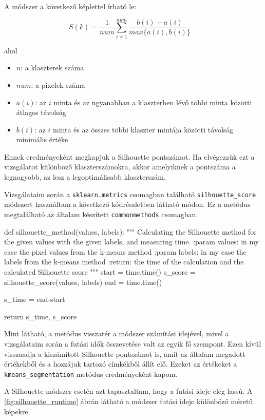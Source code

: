 A módszer a következő képlettel írható le:

\[ S(k)=\frac{1}{num} \sum_{i=1}^{num} \frac{b(i)-a(i)}{max\{a(i),b(i)\}} \quad \]

\noindent ahol
\begin{itemize}
\item $n$: a klaszterek száma
\item $num$: a pixelek száma
\item $a(i)$: az $i$ minta és az ugyanabban a klaszterben lévő többi minta közötti átlagos távolság
\item $b(i)$: az $i$ minta és az összes többi klaszter mintája közötti távolság minimális értéke
\end{itemize}
Ennek eredményeként megkapjuk a Silhouette pontszámot. Ha elvégezzük ezt a vizsgálatot különböző klaszterszámokra, akkor amelyiknek a pontszáma a legnagyobb, az lesz a legoptimálisabb klaszterszám. \cite{tomatoleaf}

Vizsgálataim során a \texttt{sklearn.metrics} csomagban található \texttt{silhouette\_score} módszert használtam a következő kódrészletben látható módon. Ez a metódus megtalálható az általam készített \texttt{commonmethods} csomagban.
\begin{python}
def silhouette_method(values, labels):
    """
    Calculating the Silhouette method for the given values with
    the given labels, and measuring time.
    :param values: in my case the pixel values from the k-means method
    :param labels: in my case the labels from the k-means method
    :return: the time of the calculation and
        the calculated Silhouette score
    """
    start = time.time()
    s_score = silhouette_score(values, labels)
    end = time.time()

    s_time = end-start

    return s_time, s_score
\end{python}
Mint látható, a metódus visszatér a módszer számítási idejével, mivel a vizsgálataim során a futási idők összevetése volt az egyik fő szempont. Ezen kívül visszaadja a kiszámított Silhouette pontszámot is, amit az általam megadott értékekből és a hozzájuk tartozó címkékből állít elő. Ezeket az értékeket a \texttt{kmeans\_segmentation} metódus eredményeként kapom.

A Silhouette módszer esetén azt tapasztaltam, hogy a futási ideje elég lassú. A \ref{fig:silhouette_runtime} ábrán látható a módszer futási ideje különböző méretű képekre.

